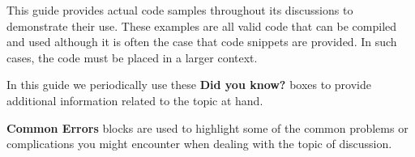 This guide provides actual code samples throughout its discussions to
demonstrate their use. These examples are all valid code that can be
compiled and used although it is often the case that code snippets are
provided. In such cases, the code must be placed in a larger context.

\begin{didyouknow}
  In this guide we periodically use these \textbf{Did you know?} boxes to
  provide additional information related to the topic at hand.
\end{didyouknow}

\begin{commonerrors}
  \textbf{Common Errors} blocks are used to highlight some of the common
  problems or complications you might encounter when dealing with the topic
  of discussion.
\end{commonerrors}
